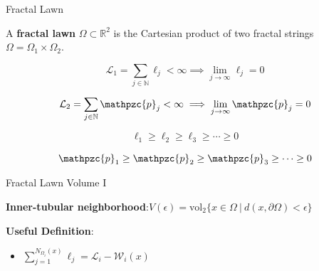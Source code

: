 \documentclass{beamer}
\newcommand{\R}{\mathbb{R}}
\newcommand{\N}{\mathbb{N}}
\newcommand{\SL}{\mathcal{L}}
\newcommand{\Om}{\Omega}
\newcommand{\W}{\mathcal{W}}
\newcommand{\p}{\mathpzc{p}}
\begin{document}
\begin{frame}{Fractal Lawn}

	\begin{definition}
	A {\bf fractal lawn} $\Om \subset \R^2$ is the Cartesian product of two fractal strings $\Om=\Om_1\times\Om_2$.
	\end{definition}
	
	\pause
	\vspace{0.2 in}

	\[ \displaystyle \SL_1 = \sum_{j \in \N} \ell_j < \infty \implies \lim_{j \to \infty} \ell_j = 0 \]
	
	\[ \displaystyle \SL_2 = \sum_{j \in \N} \p_j < \infty \implies \lim_{j \to \infty} \p_j = 0 \]
	\pause
	
	\[ \ell_1 \geq \ell_2 \geq \ell_3 \geq \cdots \geq 0 \]
	
	\[ \p_1 \geq \p_2 \geq \p_3 \geq \cdots \geq 0 \]

\end{frame}

\begin{frame}{Fractal Lawn Volume I}

{\bf Inner-tubular neighborhood}:\quad $V(\epsilon) = \text{vol}_2\{x \in \Om\ |\ d(x,\partial\Om) < \epsilon\}$
\pause
\vspace{0.2in}

{\bf Useful Definition}:
\begin{itemize}
	\item $\displaystyle \sum_{j = 1}^{N_{\Om_i}(x)}\ell_j=\SL_i - \W_i(x)$
\end{itemize}

\end{frame}
\end{document}
